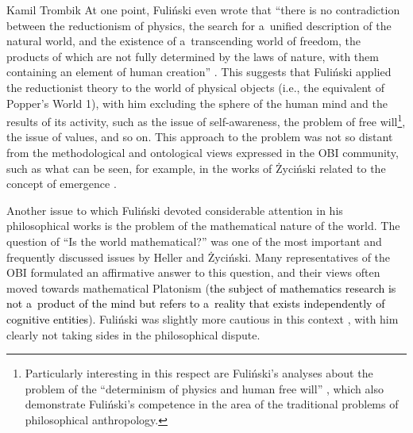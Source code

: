 \begin{artengenv}{Kamil Trombik}
At one point, Fuliński even wrote that ``there is no contradiction between the reductionism of physics, the search for a~unified description of the natural world, and the existence of a~transcending world of freedom, the products of which are not fully determined by the laws of nature, with them containing an element of human creation''
\parencite[][p.47]{fulinski_o_1993}. %
 This suggests that Fuliński applied the reductionist theory to the world of physical objects (i.e., the equivalent of Popper's World 1), with him excluding the sphere of the human mind and the results of its activity, such as the issue of self-awareness, the problem of free will\footnote{Particularly interesting in this respect are Fuliński's analyses about the problem of the ``determinism of physics and human free will'' 
\parencites[see e.g.,][]{janik_fizyka_1998}[][]{wojtowicz_determinizm_2005}, %
 which also demonstrate Fuliński's competence in the area of the traditional problems of philosophical anthropology.}, the issue of values, and so on. This approach to the problem was not so distant from the methodological and ontological views expressed in the OBI community, such as what can be seen, for example, in the works of Życiński related to the concept of emergence 
\parencite[e.g.,][]{zycinski_wszechswiat_2009}.%




Another issue to which Fuliński devoted considerable attention in his philosophical works is the problem of the mathematical nature of the world. The question of ``Is the world mathematical?'' was one of the most important and frequently discussed issues by Heller and Życiński. Many representatives of the OBI formulated an affirmative answer to this question, and their views often moved towards mathematical Platonism (\textcolor{black}{the subject of mathematics research is not a~product of the mind but refers to a~reality that exists independently of cognitive entities}). Fuliński was slightly more cautious in this context 
\parencite[e.g.,][]{janik_glos_1990}, %
 with him clearly not taking sides in the philosophical dispute.




\end{artengenv}
